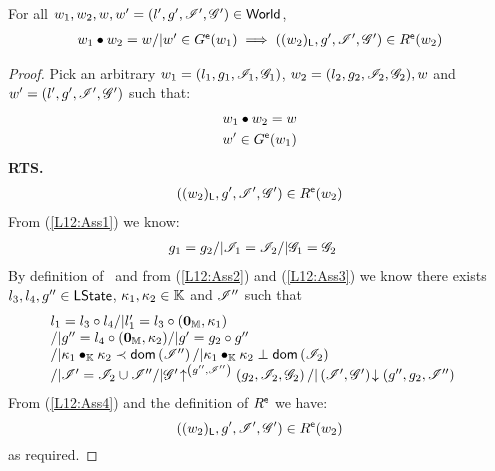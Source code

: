 %
%
\begin{lemma}[]\label{lem:extendGContainment}
%
For all $w_1, w_2, w, w' = (l', g', \mathscr{I}', \mathscr{G}') \in \textsf{World}$,
\[
\begin{array}{l}
	w_1 \bullet w_2 = w /| w' \in G^{\textsf{e}}(w_1) \implies ((w_2)_{\textsf{L}}, g', \mathscr{I}', \mathscr{G}') \in R^{\textsf{e}}(w_2)
\end{array}
\]
%
\begin{proof} Pick an arbitrary $w_1 = (l_1, g_1, \mathscr{I}_{1}, \mathscr{G}_{1})$, $w_2 = (l_2, g_2, \mathscr{I}_{2}, \mathscr{G}_{2}), w$ and $ w' = (l', g', \mathscr{I}', \mathscr{G}')$ such that:
%
\begin{align}
	& w_1 \bullet  w_2 = w \label{L12:Ass1}\\
	& w' \in G^{\textsf{e}}(w_1) \label{L12:Ass2}
\end{align}
%
\textbf{RTS.}
%
\begin{align*}
	((w_2)_{\textsf{L}}, g', \mathscr{I}', \mathscr{G}') \in R^{\textsf{e}}(w_2) 
\end{align*}
%
From (\ref{L12:Ass1}) we know:
%
\begin{align}
	& g_1 = g_2 /| \mathscr{I}_{1} = \mathscr{I}_{2} /| \mathscr{G}_{1} = \mathscr{G}_{2} \label{L12:Ass3}
\end{align}
By definition of \extendG\ and from (\ref{L12:Ass2}) and (\ref{L12:Ass3}) we know there exists $l_3, l_4, g'' \in \textsf{LState}$, $\kappa_{1}, \kappa_{2} \in \mathbb{K}$ and $\mathscr{I}''$ such that
%
\begin{align}
& \begin{array}{l}
	l_1 = l_3 \circ l_4 /| l'_1 = l_3 \circ (\mathbf{0}_{\mathbb{M}}, \kappa_{1})  \\
	/| g'' = l_4 \circ (\mathbf{0}_{\mathbb{M}}, \kappa_{2}) /| g' = g_2 \circ g'' \\
	/| \kappa_{1} \bullet_{\mathbb{K}} \kappa_{2} \prec \textsf{dom}\left( \mathscr{I}'' \right) /|  \kappa_{1} \bullet_{\mathbb{K}} \kappa_{2} \mathrel{\bot} \textsf{dom}\left( \mathscr{I}_{2} \right) \\
	/| \mathscr{I}' = \mathscr{I}_{2} \cup \mathscr{I}'' 
	/| \mathscr{G}' \!\uparrow^{\left(g'', \mathscr{I}''\right)} \left(g_2, \mathscr{I}_{2}, \mathscr{G}_{2}\right)  
	/| \left(\mathscr{I}', \mathscr{G}'\right) \!\downarrow \left(g'', g_2, \mathscr{I}''\right) 
\end{array}
\label{L12:Ass4}
\end{align}
%
From (\ref{L12:Ass4}) and the definition of $R^{\textsf{e}}$ we have:
%
\begin{equation*}
	((w_2)_{\textsf{L}}, g', \mathscr{I}{}', \mathscr{G}{}') \in R^{\textsf{e}}(w_2) 
\end{equation*}
% 
as required.
\end{proof}
%
%
\end{lemma}
%
%
